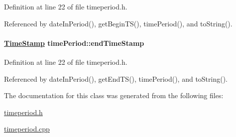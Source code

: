 Definition at line 22 of file timeperiod.h.

Referenced by date\-In\-Period(), get\-Begin\-TS(), time\-Period(), and to\-String().\hypertarget{classtimePeriod_timePeriodo1}{
\paragraph[endTimeStamp]{\setlength{\rightskip}{0pt plus 5cm}\hyperlink{classTimeStamp}{Time\-Stamp} time\-Period::end\-Time\-Stamp}\hfill}
\label{classtimePeriod_timePeriodo1}




Definition at line 22 of file timeperiod.h.

Referenced by date\-In\-Period(), get\-End\-TS(), time\-Period(), and to\-String().

The documentation for this class was generated from the following files:\begin{CompactItemize}
\item 
\hyperlink{timeperiod_8h}{timeperiod.h}\item 
\hyperlink{timeperiod_8cpp}{timeperiod.cpp}\end{CompactItemize}
